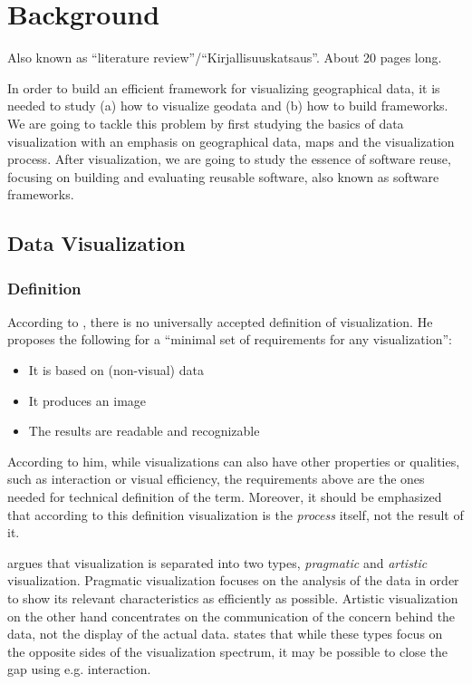 
\chapter{Background}
\label{chapter:background} 

Also known as ``literature review''/``Kirjallisuuskatsaus''. About 20 pages long.

In order to build an efficient framework for visualizing geographical data, it is needed to study (a) how to visualize geodata and (b) how to build frameworks. We are going to tackle this problem by first studying the basics of data visualization with an emphasis on geographical data, maps and the visualization process. After visualization, we are going to study the essence of software reuse, focusing on building and evaluating reusable software, also known as software frameworks.

\section{Data Visualization}

\subsection{Definition}

According to \citet[chap.~3]{kosara_visualization_2007}, there is no universally accepted definition of visualization. He proposes the following for a ``minimal set of requirements for any visualization'':

\begin{itemize}
	\item It is based on (non-visual) data
	\item It produces an image
	\item The results are readable and recognizable
\end{itemize}

According to him, while visualizations can also have other properties or qualities, such as interaction or visual efficiency, the requirements above are the ones needed for technical definition of the term. Moreover, it should be emphasized that according to this definition visualization is the \emph{process} itself, not the result of it.

\citet[chap.~4]{kosara_visualization_2007} argues that visualization is separated into two types, \emph{pragmatic} and \emph{artistic} visualization. Pragmatic visualization focuses on the analysis of the data in order to show its relevant characteristics as efficiently as possible. Artistic visualization on the other hand concentrates on the communication of the concern behind the data, not the display of the actual data. \citeauthor{kosara_visualization_2007} states that while these types focus on the opposite sides of the visualization spectrum, it may be possible to close the gap using e.g. interaction.

